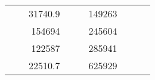 \begin{table}[H]
\begin{tabular}{|ccrccrccc}
\multicolumn{1}{|c|}{\cellcolor[HTML]{FFFFC7}}                                & \multicolumn{1}{c|}{\cellcolor[HTML]{DDFDFF}}                      & \multicolumn{1}{r|}{\cellcolor[HTML]{DAE8FC}31740.9}   & \multicolumn{1}{c|}{\cellcolor[HTML]{FFFFC7}}                                & \multicolumn{1}{c|}{\cellcolor[HTML]{DDFDFF}}                       & \multicolumn{1}{r|}{\cellcolor[HTML]{DDFDFF}149263}    &                                                                              &                                                                    &                                                        \\ \cline{3-3} \cline{6-6}
\multicolumn{1}{|c|}{\cellcolor[HTML]{FFFFC7}}                                & \multicolumn{1}{c|}{\cellcolor[HTML]{DDFDFF}}                      & \multicolumn{1}{r|}{\cellcolor[HTML]{DDFDFF}154694}    & \multicolumn{1}{c|}{\cellcolor[HTML]{FFFFC7}}                                & \multicolumn{1}{c|}{\cellcolor[HTML]{DDFDFF}}                       & \multicolumn{1}{r|}{\cellcolor[HTML]{DAE8FC}245604}    &                                                                              &                                                                    &                                                        \\ \cline{3-3} \cline{6-6}
\multicolumn{1}{|c|}{\cellcolor[HTML]{FFFFC7}}                                & \multicolumn{1}{c|}{\cellcolor[HTML]{DDFDFF}}                      & \multicolumn{1}{r|}{\cellcolor[HTML]{DAE8FC}122587}    & \multicolumn{1}{c|}{\cellcolor[HTML]{FFFFC7}}                                & \multicolumn{1}{c|}{\cellcolor[HTML]{DDFDFF}}                       & \multicolumn{1}{r|}{\cellcolor[HTML]{DDFDFF}285941}    &                                                                              &                                                                    &                                                        \\ \cline{3-3} \cline{6-6}
\multicolumn{1}{|c|}{\cellcolor[HTML]{FFFFC7}}                                & \multicolumn{1}{c|}{\cellcolor[HTML]{DDFDFF}}                      & \multicolumn{1}{r|}{\cellcolor[HTML]{DDFDFF}22510.7}   & \multicolumn{1}{c|}{\cellcolor[HTML]{FFFFC7}}                                & \multicolumn{1}{c|}{\cellcolor[HTML]{DDFDFF}}                       & \multicolumn{1}{r|}{\cellcolor[HTML]{DAE8FC}625929}    &                                                                              &                                                                    &                                                        \\ \cline{3-3} \cline{6-6}

\end{tabular}
\end{table}
